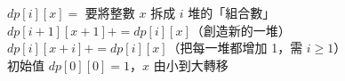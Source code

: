 $dp[i][x] = $ 要將整數 $x$ 拆成 $i$ 堆的「組合數」\\

\noindent
$dp[i+1][x+1] += dp[i][x]$（創造新的一堆）\\
$dp[i][x+i] += dp[i][x]$（把每一堆都增加 1，需 $i \ge 1$）\\
初始值 $dp[0][0] = 1$，$x$ 由小到大轉移
